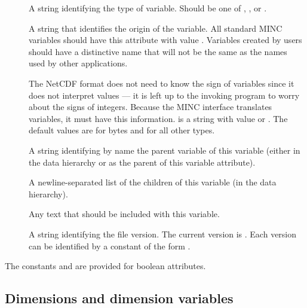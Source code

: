 \documentclass{article}
\begin{document}
\begin{description}
   \item [] A string identifying the type of variable.
      Should be one of , ,
       or .
   \item [] A string that identifies the origin of the
      variable. All standard MINC variables should have this attribute
      with value . Variables created by users should have a
      distinctive name that will not be the same as the names used by
      other applications.
   \item [] The NetCDF format does not need to know
      the sign of variables since it does not interpret values --- it
      is left up to the invoking program to worry about the signs of
      integers. Because the MINC interface translates variables, it
      must have this information.  is a string with
      value  or . The default values are
       for bytes and  for all other types.
   \item [] A string identifying by name the parent
      variable of this variable (either in the data hierarchy or as
      the parent of this variable attribute).
   \item [] A newline-separated list of the children
      of this variable (in the data hierarchy).
   \item [] Any text that should be included with
      this variable.
   \item [] A string identifying the file version. The
      current version is . Each version can be
      identified by a constant of the form .
\end{description}

The constants  and  are provided for
boolean attributes. 

\subsection{Dimensions and dimension variables}
\end{document}
